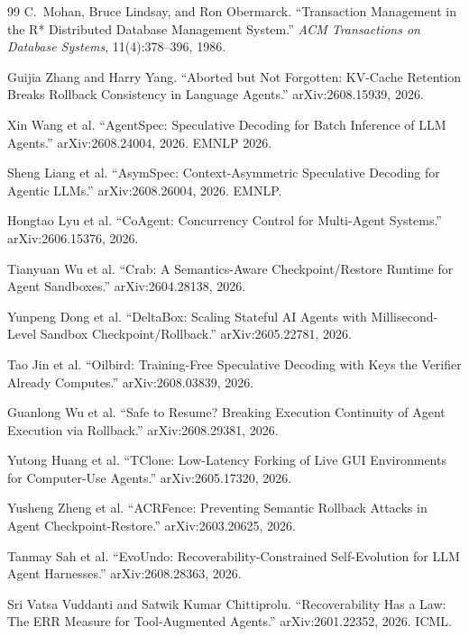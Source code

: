 \begin{thebibliography}{99}
C.~Mohan, Bruce Lindsay, and Ron Obermarck.
``Transaction Management in the R* Distributed Database Management System.''
\emph{ACM Transactions on Database Systems}, 11(4):378--396, 1986.

Guijia Zhang and Harry Yang.
``Aborted but Not Forgotten: KV-Cache Retention Breaks Rollback Consistency in Language Agents.''
arXiv:2608.15939, 2026.

Xin Wang et al.
``AgentSpec: Speculative Decoding for Batch Inference of LLM Agents.''
arXiv:2608.24004, 2026. EMNLP 2026.

Sheng Liang et al.
``AsymSpec: Context-Asymmetric Speculative Decoding for Agentic LLMs.''
arXiv:2608.26004, 2026. EMNLP.

Hongtao Lyu et al.
``CoAgent: Concurrency Control for Multi-Agent Systems.''
arXiv:2606.15376, 2026.

Tianyuan Wu et al.
``Crab: A Semantics-Aware Checkpoint/Restore Runtime for Agent Sandboxes.''
arXiv:2604.28138, 2026.

Yunpeng Dong et al.
``DeltaBox: Scaling Stateful AI Agents with Millisecond-Level Sandbox Checkpoint/Rollback.''
arXiv:2605.22781, 2026.

Tao Jin et al.
``Oilbird: Training-Free Speculative Decoding with Keys the Verifier Already Computes.''
arXiv:2608.03839, 2026.

Guanlong Wu et al.
``Safe to Resume? Breaking Execution Continuity of Agent Execution via Rollback.''
arXiv:2608.29381, 2026.

Yutong Huang et al.
``TClone: Low-Latency Forking of Live GUI Environments for Computer-Use Agents.''
arXiv:2605.17320, 2026.

Yusheng Zheng et al.
``ACRFence: Preventing Semantic Rollback Attacks in Agent Checkpoint-Restore.''
arXiv:2603.20625, 2026.

Tanmay Sah et al.
``EvoUndo: Recoverability-Constrained Self-Evolution for LLM Agent Harnesses.''
arXiv:2608.28363, 2026.

Sri Vatsa Vuddanti and Satwik Kumar Chittiprolu.
``Recoverability Has a Law: The ERR Measure for Tool-Augmented Agents.''
arXiv:2601.22352, 2026. ICML.
\end{thebibliography}


